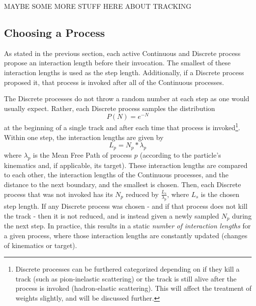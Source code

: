 \documentclass[12pt]{article}
\begin{document}
MAYBE SOME MORE STUFF HERE ABOUT TRACKING

\subsection{Choosing a Process}
As stated in the previous section, each active Continuous and Discrete process propose an interaction length before their invocation. The smallest of these interaction lengths is used as the step length. Additionally, if a Discrete process proposed it, that process is invoked after all of the Continuous processes. 

The Discrete processes do not throw a random number at each step as one would usually expect. Rather, each Discrete process samples the distribution 
\begin{equation}\label{eq:1}
P(N) = e^{-N}
\end{equation}
at the beginning of a single track and after each time that process is invoked\footnote{Discrete processes can be furthered categorized depending on if they kill a track (such as pion-inelastic scattering) or the track is still alive after the process is invoked (hadron-elastic scattering). This will affect the treatment of weights slightly, and will be discussed further.\label{fn_Discrete}}. Within one step, the interaction lengths are given by 
\begin{equation}\label{eq:2}
L_p = N_p * \lambda_p
\end{equation}
where $\lambda_p$ is the Mean Free Path of process $p$ (according to the particle's kinematics and, if applicable, its target). These interaction lengths are compared to each other, the interaction lengths of the Continuous processes, and the distance to the next boundary, and the smallest is chosen. Then, each Discrete process that was not invoked has its $N_p$ reduced by $\frac{L_s}{\lambda_p}$, where $L_s$ is the chosen step length. If any Discrete process was chosen - and if that process does not kill the track - then it is not reduced, and is instead given a newly sampled $N_p$ during the next step. In practice, this results in a static \textit{number of interaction lengths} for a given process, where those interaction lengths are constantly updated (changes of kinematics or target).
\end{document}
